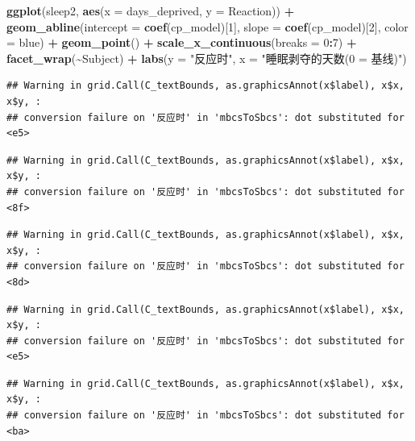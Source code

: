 \documentclass[
]{book}
\newenvironment{Shaded}{\begin{snugshade}}{\end{snugshade}}
\newcommand{\AttributeTok}[1]{\textcolor[rgb]{0.13,0.29,0.53}{#1}}
\newcommand{\DecValTok}[1]{\textcolor[rgb]{0.00,0.00,0.81}{#1}}
\newcommand{\FunctionTok}[1]{\textcolor[rgb]{0.13,0.29,0.53}{\textbf{#1}}}
\newcommand{\NormalTok}[1]{#1}
\newcommand{\SpecialCharTok}[1]{\textcolor[rgb]{0.81,0.36,0.00}{\textbf{#1}}}
\newcommand{\StringTok}[1]{\textcolor[rgb]{0.31,0.60,0.02}{#1}}
\begin{document}
\begin{Shaded}
\begin{Highlighting}[]
\FunctionTok{ggplot}\NormalTok{(sleep2, }\FunctionTok{aes}\NormalTok{(}\AttributeTok{x =}\NormalTok{ days\_deprived, }\AttributeTok{y =}\NormalTok{ Reaction)) }\SpecialCharTok{+}
  \FunctionTok{geom\_abline}\NormalTok{(}\AttributeTok{intercept =} \FunctionTok{coef}\NormalTok{(cp\_model)[}\DecValTok{1}\NormalTok{],}
              \AttributeTok{slope =} \FunctionTok{coef}\NormalTok{(cp\_model)[}\DecValTok{2}\NormalTok{],}
              \AttributeTok{color =} \StringTok{\textquotesingle{}blue\textquotesingle{}}\NormalTok{) }\SpecialCharTok{+}
  \FunctionTok{geom\_point}\NormalTok{() }\SpecialCharTok{+}
  \FunctionTok{scale\_x\_continuous}\NormalTok{(}\AttributeTok{breaks =} \DecValTok{0}\SpecialCharTok{:}\DecValTok{7}\NormalTok{) }\SpecialCharTok{+}
  \FunctionTok{facet\_wrap}\NormalTok{(}\SpecialCharTok{\textasciitilde{}}\NormalTok{Subject) }\SpecialCharTok{+}
  \FunctionTok{labs}\NormalTok{(}\AttributeTok{y =} \StringTok{"反应时"}\NormalTok{, }\AttributeTok{x =} \StringTok{"睡眠剥夺的天数(0 = 基线)"}\NormalTok{)}
\end{Highlighting}
\end{Shaded}

\begin{verbatim}
## Warning in grid.Call(C_textBounds, as.graphicsAnnot(x$label), x$x, x$y, :
## conversion failure on '反应时' in 'mbcsToSbcs': dot substituted for <e5>
\end{verbatim}

\begin{verbatim}
## Warning in grid.Call(C_textBounds, as.graphicsAnnot(x$label), x$x, x$y, :
## conversion failure on '反应时' in 'mbcsToSbcs': dot substituted for <8f>
\end{verbatim}

\begin{verbatim}
## Warning in grid.Call(C_textBounds, as.graphicsAnnot(x$label), x$x, x$y, :
## conversion failure on '反应时' in 'mbcsToSbcs': dot substituted for <8d>
\end{verbatim}

\begin{verbatim}
## Warning in grid.Call(C_textBounds, as.graphicsAnnot(x$label), x$x, x$y, :
## conversion failure on '反应时' in 'mbcsToSbcs': dot substituted for <e5>
\end{verbatim}

\begin{verbatim}
## Warning in grid.Call(C_textBounds, as.graphicsAnnot(x$label), x$x, x$y, :
## conversion failure on '反应时' in 'mbcsToSbcs': dot substituted for <ba>
\end{verbatim}
\end{document}
